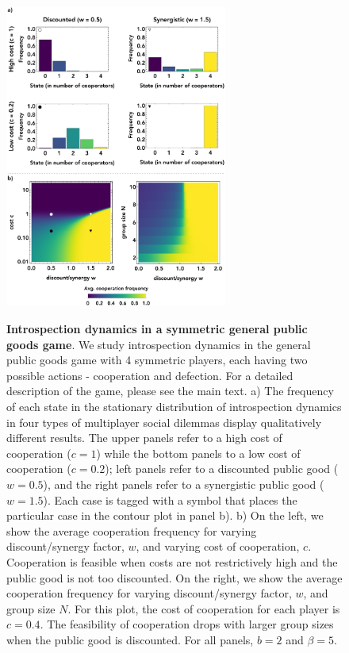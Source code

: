 \documentclass[11pt]{article}
\theoremstyle{plainCl1}
\theoremstyle{plainCl2}
\begin{document}
\clearpage
\begin{figure}
\centering
\includegraphics[width =  0.65\textwidth, keepaspectratio]{figures/figure3.eps}~\\[0.4cm]
\caption{\onehalfspacing
\textbf{Introspection dynamics in a symmetric general public goods game}. We study introspection dynamics in the general public goods game with 4 symmetric players, each having two possible actions - cooperation and defection. For a detailed description of the game, please see the main text. a) The frequency of each state in the stationary distribution of introspection dynamics in four types of multiplayer social dilemmas display qualitatively different results. The upper panels refer to a high cost of cooperation ($c=1$) while the bottom panels to a low cost of cooperation ($c = 0.2$); left panels refer to a discounted public good ($w = 0.5$), and the right panels refer to a synergistic public good ($w = 1.5$). Each case is tagged with a symbol that places the particular case in the contour plot in panel b). b) On the left, we show the average cooperation frequency for varying discount/synergy factor, $w$, and varying cost of cooperation, $c$. Cooperation is feasible when costs are not restrictively high and the public good is not too discounted. On the right, we show the average cooperation frequency for varying discount/synergy factor, $w$, and group size $N$. For this plot, the cost of cooperation for each player is $c = 0.4$. The feasibility of cooperation drops with larger group sizes when the public good is discounted. For all panels, $b=2$ and $\beta = 5$.} 
\label{Fig:GPGG-symmetric}
\end{figure}
\end{document}
